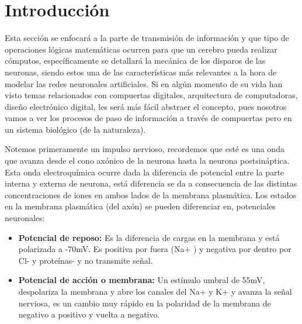 
\section{Introducción}
Esta sección se enfocará a la parte de transmisión de información y que tipo de operaciones lógicas matemáticas ocurren para que un cerebro pueda realizar cómputos, específicamente se detallará la mecánica de los disparos de las neuronas, siendo estos una de las características más relevantes a la hora de modelar las redes neuronales artificiales. Si en algún momento de su vida han visto temas relacionados con compuertas digitales, arquitectura de computadoras, diseño electrónico digital, les será más fácil abstraer el concepto, pues nosotros vamos a ver los procesos de paso de información a través de compuertas pero en un sistema biológico (de la naturaleza). 

Notemos primeramente un impulso nervioso, recordemos que esté es una onda que avanza desde el cono axónico de la neurona hasta la neurona postsináptica. Esta onda electroquímica ocurre dada la diferencia de potencial entre la parte interna y externa de neurona, está diferencia se da a consecuencia de las distintas concentraciones de iones en ambos lados de la membrana plasmática. Los estados en la membrana plasmática (del axón) se pueden diferenciar en, potenciales neuronales:

\begin{itemize}
\item \textbf{Potencial de reposo:} Es la diferencia de cargas en la membrana y está polarizada a -70mV. Es positiva por fuera (Na+ ) y negativa por dentro por Cl- y proteínas- y no transmite señal. 
\item \textbf{Potencial de acción o membrana:} Un estímulo umbral de 55mV, despolariza la membrana y abre los canales del Na+ y K+ y avanza la señal nerviosa, es un cambio muy rápido en la polaridad de la membrana de negativo a positivo y vuelta a negativo.
\end{itemize}

